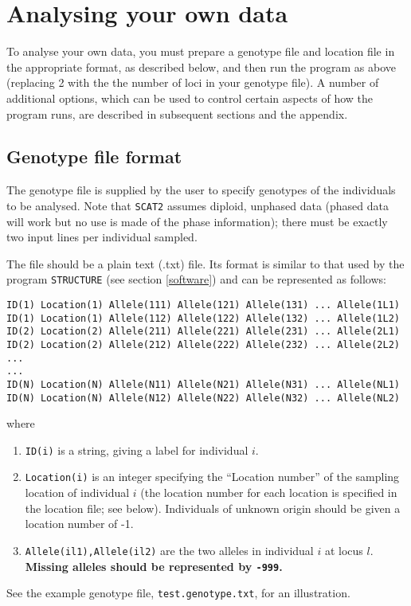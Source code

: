 \documentclass[10pt,titlepage,times,letterpaper]{article}
\def\SCAT{{\tt SCAT2} }
\begin{document}
\section{Analysing your own data}

To analyse your own data, you must prepare a genotype file and
location file in the appropriate format, as described below, and then
run the program as above (replacing 2 with the 
the number of loci in your genotype file). A number of additional options, which
can be used to control certain aspects of how the program runs, are
described in subsequent sections and the appendix.

\subsection{Genotype file format} \label{inputfile}

The genotype file is supplied by the user to specify genotypes of the
individuals to be analysed.   Note that \SCAT assumes diploid, unphased
data (phased data will work but no use is made of the phase information);
there must be exactly two input lines per individual sampled.

The file should be a plain text (.txt) file.
Its format is similar to that
used by the program {\tt STRUCTURE} (see section \ref{software})
and can be represented as follows:

\begin{verbatim}
ID(1) Location(1) Allele(111) Allele(121) Allele(131) ... Allele(1L1)
ID(1) Location(1) Allele(112) Allele(122) Allele(132) ... Allele(1L2)
ID(2) Location(2) Allele(211) Allele(221) Allele(231) ... Allele(2L1)
ID(2) Location(2) Allele(212) Allele(222) Allele(232) ... Allele(2L2)
...
...
ID(N) Location(N) Allele(N11) Allele(N21) Allele(N31) ... Allele(NL1)
ID(N) Location(N) Allele(N12) Allele(N22) Allele(N32) ... Allele(NL2)
\end{verbatim}
where
\begin{enumerate}
\item{\tt ID(i)} is a string, giving a label for individual $i$.
\item{\tt Location(i)} is an integer specifying the ``Location number'' of
the sampling location
of individual $i$ (the location number for each location 
is specified in the location file; see below). Individuals of unknown
origin should be given a location number of -1.
\item{{\tt Allele(il1),Allele(il2)}} are the two alleles in
individual $i$ at locus $l$. {\bf Missing alleles should
be represented by {\tt -999}.}
\end{enumerate}
See the example genotype file, {\tt test.genotype.txt}, for an illustration.
\end{document}
